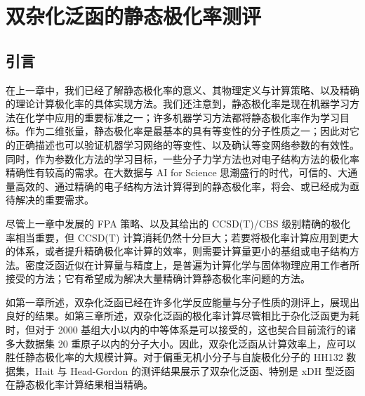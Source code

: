 
\chapter{双杂化泛函的静态极化率测评}
\label{sec.6.title}

\section{引言}

在上一章中，我们已经了解静态极化率的意义、其物理定义与计算策略、以及精确的理论计算极化率的具体实现方法。我们还注意到，静态极化率是现在机器学习方法在化学中应用的重要标准之一；许多机器学习方法都将静态极化率作为学习目标\cite{Ramakrishnan-Lilienfeld.SD.2014, Gilmer-Dahl.ICML.2017, Faber-Lilienfeld.JCTC.2017, Schuett-Mueller.NIPS.2017, Schuett-Mueller.JCP.2018, Wilkins-Ceriotti.PNAS.2019, Schuett-Gastegger.arXiv.2021, Zhang-Jiang.Elsevier.2023, Zou-Hu.NCS.2023}。作为二维张量，静态极化率是最基本的具有等变性的分子性质之一；因此对它的正确描述也可以验证机器学习网络的等变性、以及确认等变网络参数的有效性\cite{Cohen-Welling.arXiv.2016, Schuett-Gastegger.arXiv.2021, Brandstetter-Welling.arXiv.2022, Geiger-Smidt.arXiv.2022}。同时，作为参数化方法的学习目标，一些分子力学方法也对电子结构方法的极化率精确性有较高的需求\cite{Halgren-Damm.COSB.2001, Baker-Baker.WCMS.2015, Goloviznina-Padua.JCTC.2019, Schauperl-Gilson.CC.2020}。在大数据与 AI for Science 思潮盛行的时代，可信的、大通量高效的、通过精确的电子结构方法计算得到的静态极化率，将会、或已经成为亟待解决的重要需求。

尽管上一章中发展的 FPA 策略、以及其给出的 CCSD(T)/CBS 级别精确的极化率相当重要，但 CCSD(T) 计算消耗仍然十分巨大；若要将极化率计算应用到更大的体系，或者提升精确极化率计算的效率，则需要计算量更小的基组或电子结构方法。密度泛函近似在计算量与精度上，是普遍为计算化学与固体物理应用工作者所接受的方法；它有希望成为解决大量精确计算静态极化率问题的方法。

如第一章所述，双杂化泛函已经在许多化学反应能量与分子性质的测评上，展现出良好的结果。如第三章所述，双杂化泛函的极化率计算尽管相比于杂化泛函更为耗时，但对于 2000 基组大小以内的中等体系是可以接受的，这也契合目前流行的诸多大数据集 20 重原子以内的分子大小\cite{Ruddigkeit-Reymond.JCIM.2012, Ramakrishnan-Lilienfeld.SD.2014, Bowman-Yu.JCP.2022, Zou-Hu.NCS.2023}。因此，双杂化泛函从计算效率上，应可以胜任静态极化率的大规模计算。对于偏重无机小分子与自旋极化分子的 HH132 数据集，Hait 与 Head-Gordon 的测评结果展示了双杂化泛函、特别是 xDH 型泛函在静态极化率计算结果相当精确\cite{Hait-Head-Gordon.PCCP.2018}。

